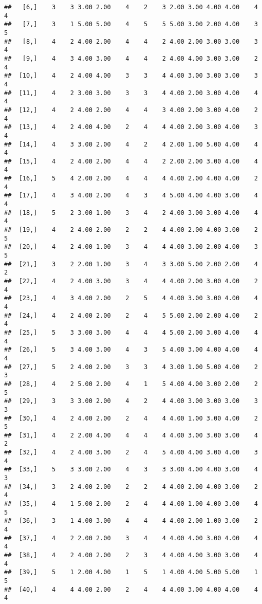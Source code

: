 \documentclass[]{article}
\begin{document}
\begin{verbatim}
##   [6,]    3    3 3.00 2.00    4    2    3 2.00 3.00 4.00 4.00    4    4
##   [7,]    3    1 5.00 5.00    4    5    5 5.00 3.00 2.00 4.00    3    5
##   [8,]    4    2 4.00 2.00    4    4    2 4.00 2.00 3.00 3.00    3    4
##   [9,]    4    3 4.00 3.00    4    4    2 4.00 4.00 3.00 3.00    2    4
##  [10,]    4    2 4.00 4.00    3    3    4 4.00 3.00 3.00 3.00    3    4
##  [11,]    4    2 3.00 3.00    3    3    4 4.00 2.00 3.00 4.00    4    4
##  [12,]    4    2 4.00 2.00    4    4    3 4.00 2.00 3.00 4.00    2    4
##  [13,]    4    2 4.00 4.00    2    4    4 4.00 2.00 3.00 4.00    3    4
##  [14,]    4    3 3.00 2.00    4    2    4 2.00 1.00 5.00 4.00    4    4
##  [15,]    4    2 4.00 2.00    4    4    2 2.00 2.00 3.00 4.00    4    4
##  [16,]    5    4 2.00 2.00    4    4    4 4.00 2.00 4.00 4.00    2    4
##  [17,]    4    3 4.00 2.00    4    3    4 5.00 4.00 4.00 3.00    4    4
##  [18,]    5    2 3.00 1.00    3    4    2 4.00 3.00 3.00 4.00    4    4
##  [19,]    4    2 4.00 2.00    2    2    4 4.00 2.00 4.00 3.00    2    5
##  [20,]    4    2 4.00 1.00    3    4    4 4.00 3.00 2.00 4.00    3    5
##  [21,]    3    2 2.00 1.00    3    4    3 3.00 5.00 2.00 2.00    4    2
##  [22,]    4    2 4.00 3.00    3    4    4 4.00 2.00 3.00 4.00    2    4
##  [23,]    4    3 4.00 2.00    2    5    4 4.00 3.00 3.00 4.00    4    4
##  [24,]    4    2 4.00 2.00    2    4    5 5.00 2.00 2.00 4.00    2    4
##  [25,]    5    3 3.00 3.00    4    4    4 5.00 2.00 3.00 4.00    4    4
##  [26,]    5    3 4.00 3.00    4    3    5 4.00 3.00 4.00 4.00    4    4
##  [27,]    5    2 4.00 2.00    3    3    4 3.00 1.00 5.00 4.00    2    3
##  [28,]    4    2 5.00 2.00    4    1    5 4.00 4.00 3.00 2.00    2    5
##  [29,]    3    3 3.00 2.00    4    2    4 4.00 3.00 3.00 3.00    3    3
##  [30,]    4    2 4.00 2.00    2    4    4 4.00 1.00 3.00 4.00    2    5
##  [31,]    4    2 2.00 4.00    4    4    4 4.00 3.00 3.00 3.00    4    2
##  [32,]    4    2 4.00 3.00    2    4    5 4.00 4.00 3.00 4.00    3    4
##  [33,]    5    3 3.00 2.00    4    3    3 3.00 4.00 4.00 3.00    4    3
##  [34,]    3    2 4.00 2.00    2    2    4 4.00 2.00 4.00 3.00    2    4
##  [35,]    4    1 5.00 2.00    2    4    4 4.00 1.00 4.00 3.00    4    5
##  [36,]    3    1 4.00 3.00    4    4    4 4.00 2.00 1.00 3.00    2    4
##  [37,]    4    2 2.00 2.00    3    4    4 4.00 4.00 3.00 4.00    4    4
##  [38,]    4    2 4.00 2.00    2    3    4 4.00 4.00 3.00 3.00    4    4
##  [39,]    5    1 2.00 4.00    1    5    1 4.00 4.00 5.00 5.00    1    5
##  [40,]    4    4 4.00 2.00    2    4    4 4.00 3.00 4.00 4.00    4    4

\end{verbatim}
\end{document}
